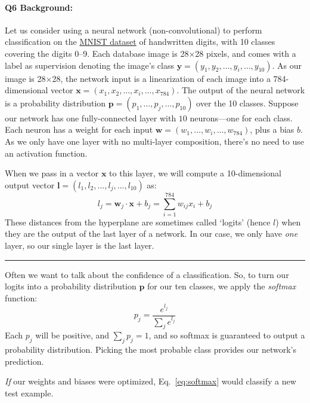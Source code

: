 \paragraph{Q6 Background:}
Let us consider using a neural network (non-convolutional) to perform classification on the \href{http://yann.lecun.com/exdb/mnist/}{MNIST dataset} of handwritten digits, with 10 classes covering the digits 0--9. Each database image is 28$\times$28 pixels, and comes with a label as supervision denoting the image's class $\mathbf{y}=(y_1,y_2,\dots,y_i,\dots,y_{10})$. As our image is 28$\times$28, the network input is a linearization of each image into a 784-dimensional vector $\mathbf{x}=(x_1,x_2,\dots,x_i,\dots,x_{784})$. The output of the neural network is a probability distribution $\mathbf{p}=(p_1,\dots,p_j,\dots,p_{10})$ over the 10 classes. Suppose our network has one fully-connected layer with $10$ neurons---one for each class. Each neuron has a weight for each input $\mathbf{w}=(w_1,\dots,w_i,\dots,w_{784})$, plus a bias $b$. As we only have one layer with no multi-layer composition, there's no need to use an activation function.

When we pass in a vector $\mathbf{x}$ to this layer, we will compute a 10-dimensional output vector $\mathbf{l}=(l_1,l_2,...,l_j,...,l_{10})$ as:
\begin{equation}
    l_j = \mathbf{w}_j \cdot \mathbf{x} + b_j = \sum_{i=1}^{784}w_{ij}x_i + b_j
\end{equation}
These distances from the hyperplane are sometimes called `logits' (hence $l$) when they are the output of the last layer of a network. In our case, we only have \emph{one} layer, so our single layer is the last layer.

\hspace{\fill}\rule{0.5\linewidth}{.5pt}\hspace{\fill}

Often we want to talk about the confidence of a classification. So, to turn our logits into a probability distribution $\mathbf{p}$ for our ten classes, we apply the \emph{softmax} function:
\begin{equation}
    p_j = \frac{e^{l_j}}{\sum_je^{l_j}}
    \label{eq:softmax}
\end{equation}
Each $p_j$ will be positive, and $\sum_jp_j = 1$, and so softmax is guaranteed to output a probability distribution. Picking the most probable class provides our network's prediction.

\emph{If} our weights and biases were optimized, Eq.~\ref{eq:softmax} would classify a new test example.

